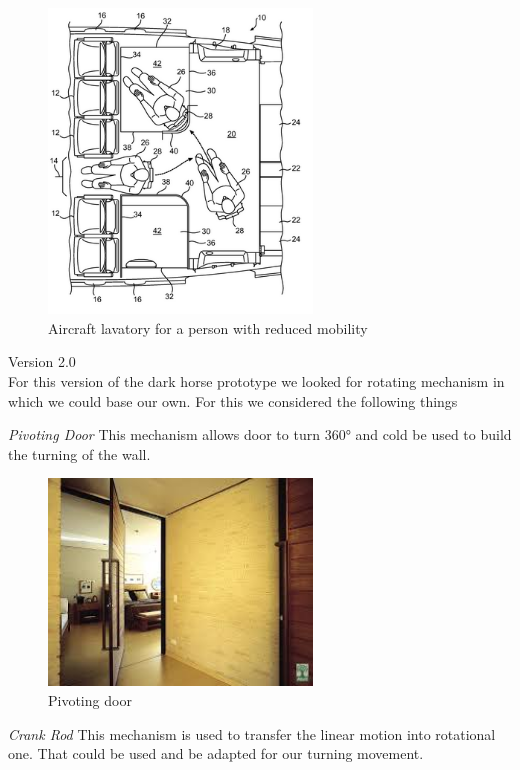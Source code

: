 \begin{figure}[h]
\centering
\includegraphics[width=7cm]{brazil_images/image017.png}
\caption{Aircraft lavatory for a person with reduced mobility}
\label{fig:aircraft_lavatory}
\end{figure}

Version 2.0 \\

For this version of the dark horse prototype we looked for rotating mechanism in which we could base our own. For this we considered the following things

\emph{Pivoting Door} This mechanism allows door to turn 360° and cold be used to build the turning of the wall.

\begin{figure}[h]
\centering
\includegraphics[width=7cm]{brazil_images/image018.jpg}
\caption{Pivoting door} %
\label{fig:pivoting_door}
\end{figure}


\emph{Crank Rod} This mechanism is used to transfer the linear motion into rotational one. That could be used and be adapted for our turning movement.

